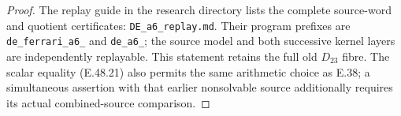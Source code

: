 \begin{proof}
The replay guide in the research directory lists the complete
source-word and quotient certificates:
\texttt{DE\_a6\_replay.md}.
Their program prefixes are \texttt{de\_ferrari\_a6\_}
and \texttt{de\_a6\_}; the source model and both successive
kernel layers are independently replayable.
This statement retains the full old $D_{23}$ fibre.
The scalar equality \textup{(E.48.21)} also permits the
same arithmetic choice as E.38; a simultaneous assertion
with that earlier nonsolvable source additionally requires
its actual combined-source comparison.
\end{proof}
